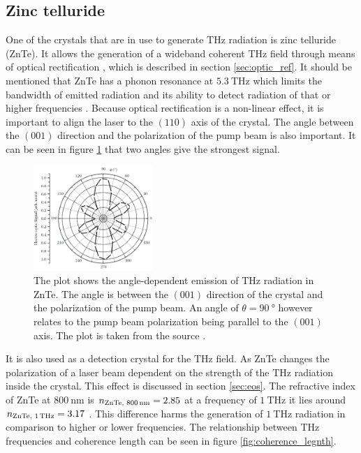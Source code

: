 \subsection{Zinc telluride}
\label{sec:znte}
One of the crystals that are in use to generate $\si{\tera\hertz}$ radiation is zinc telluride (ZnTe). 
It allows the generation of a wideband coherent $\si{\tera\hertz}$ field through means of optical rectification \cite{ZnTe_Nahata_Weling_1996}, which is described in section \ref{sec:optic_ref}.
It should be mentioned that ZnTe has a phonon resonance at $\SI{5.3}{\tera\hertz}$ which limits the bandwidth of emitted radiation and its ability to detect radiation of that or higher frequencies \cite{phonon_modes}.
Because optical rectification is a non-linear effect, it is important to align the laser to the $(110)$ axis of the crystal.
The angle between the $(001)$ direction and the polarization of the pump beam is also important.
It can be seen in figure \ref{fig:polarization_dependence_angle} that two angles give the strongest signal.
\begin{figure}
    \centering
    \includegraphics[width=0.4\textwidth]{refferenced_pic/degreedepenceZnTe.png}
    \caption{The plot shows the angle-dependent emission of $\si{\tera\hertz}$ radiation in ZnTe.
    The angle is between the $(001)$ direction of the crystal and the polarization of the pump beam. An angle of $\theta = \SI{90}{\degree}$ however relates to the pump beam polarization being parallel to the $(001)$ axis.
    The plot is taken from the source \cite{selig}.}
    \label{fig:polarization_dependence_angle}
\end{figure}
It is also used as a detection crystal for the $\si{\tera\hertz}$ field.
As ZnTe changes the polarization of a laser beam dependent on the strength of the $\si{\tera\hertz}$ radiation inside the crystal.
This effect is discussed in section \ref{sec:eos}.
The refractive index of ZnTe at $\SI{800}{\nano\meter}$ is $n_\text{ZnTe, 800\,nm} = 2.85$ \cite{refractive_index_znte} at a frequency of $\SI{1}{\tera\hertz}$ it lies around  $n_\text{ZnTe, 1\,THz} = 3.17$ \cite{hebling2004tunable}.
This difference harms the generation of $\SI{1}{\tera\hertz}$ radiation in comparison to higher or lower frequencies.
The relationship between $\si{\tera\hertz}$ frequencies and coherence length can be seen in figure \ref{fig:coherence_legnth}.
